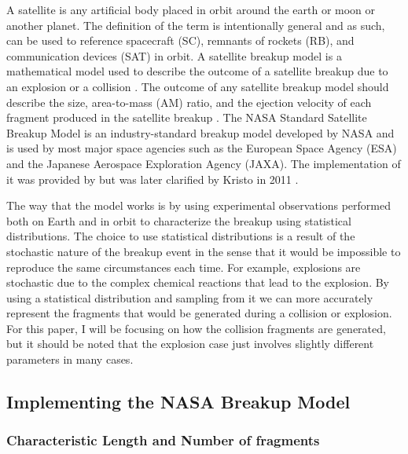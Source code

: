 \documentclass[a4paper, 12pt]{article}
\begin{document}
A satellite is any artificial body placed in orbit around the earth or moon or another planet. The definition of the term is intentionally general and as such, can be used to reference spacecraft (SC), remnants of rockets (RB), and communication devices (SAT) in orbit.  A satellite breakup model is a mathematical model used to describe the outcome of a satellite breakup due to an explosion or a collision \citep{jer_chyi_liou_orbital_nodate}.  The outcome of any satellite breakup model should describe the size, area-to-mass (AM) ratio, and the ejection velocity of each fragment produced in the satellite breakup \citep{johnson_nasas_2001}. The NASA Standard Satellite Breakup Model is an industry-standard breakup model developed by NASA and is used by most major space agencies such as the European Space Agency (ESA) and the Japanese Aerospace Exploration Agency (JAXA). The implementation of it was provided by \cite{johnson_nasas_2001} but was later clarified by Kristo in 2011 \citep{krisko_proper_2011}. 

The way that the model works is by using experimental observations performed both on Earth and in orbit to characterize the breakup using statistical distributions. The choice to use statistical distributions is a result of the stochastic nature of the breakup event in the sense that it would be impossible to reproduce the same circumstances each time. For example, explosions are stochastic due to the complex chemical reactions that lead to the explosion.  By using a statistical distribution and sampling from it we can more accurately represent the fragments that would be generated during a collision or explosion. For this paper, I will be focusing on how the collision fragments are generated, but it should be noted that the explosion case just involves slightly different parameters in many cases.

\newpage

\subsection{Implementing the NASA Breakup Model}

\subsubsection{Characteristic Length and Number of fragments}
\end{document}
